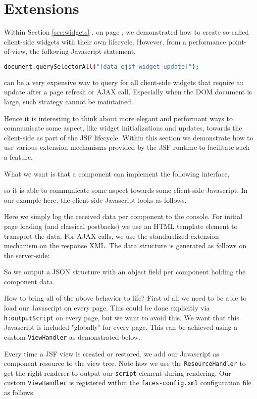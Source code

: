 \section{Extensions}
Within Section \ref{sec:widgets} , on page \pageref{sec:widgets}, we demonstrated how to create so-called client-side widgets with their own lifecycle.
However, from a performance point-of-view, the following Javascript statement,
\begin{lstlisting}[language=bash]
	document.querySelectorAll("[data-ejsf-widget-update]");
\end{lstlisting}
can be a very expensive way to query for all client-side widgets that require an update after a page refresh or AJAX call.
Especially when the DOM document is large, such strategy cannot be maintained.

Hence it is interesting to think about more elegant and performant ways to communicate some aspect, like widget initializations and updates, towards the client-side as part of the JSF lifecycle.
Within this section we demonstrate how to use various extension mechanisms provided by the JSF runtime to facilitate such a feature.

What we want is that a component can implement the following interface,

so it is able to communicate some aspect towards some client-side Javascript.
In our example here, the client-side Javascript looks as follows,

Here we simply log the received data per component to the console.
For initial page loading (and classical postbacks) we use an HTML template element to transport the data.
For AJAX calls, we use the standardized extension mechanism on the response XML.
The data structure is generated as follows on the server-side:

So we output a JSON structure with an object field per component holding the component data.

How to bring all of the above behavior to life?
First of all we need to be able to load our Javascript on every page.
This could be done explicitly via \texttt{h:outputScript} on every page, but we want to avoid this.
We want that this Javascript is included "globally" for every page.
This can be achieved using a custom \texttt{ViewHandler} as demonstrated below.

Every time a JSF view is created or restored, we add our Javascript as component resource to the view tree.
Note how we use the \texttt{ResourceHandler} to get the right renderer to output our \texttt{script} element during rendering.
Our custom \texttt{ViewHandler} is registered within the \texttt{faces-config.xml} configuration file as follows.


